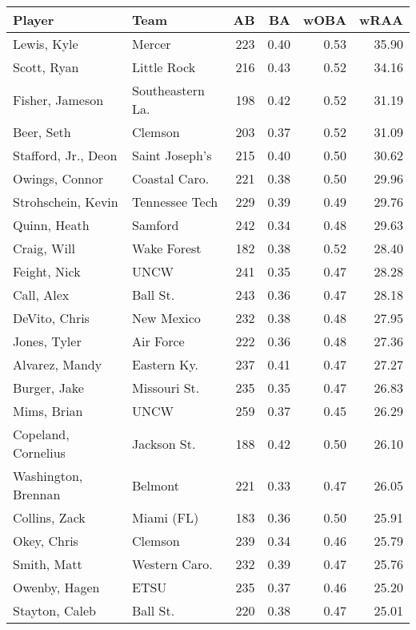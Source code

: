 \documentclass[12pt]{article}
\begin{document}
	
	\begin{table}[ht]
		\centering
		\begin{tabular}{llrrrr}
			\hline
			Player & Team & AB & BA & wOBA & wRAA \\ 
			\hline
			Lewis, Kyle & Mercer & 223 & 0.40 & 0.53 & 35.90 \\ 
			Scott, Ryan & Little Rock & 216 & 0.43 & 0.52 & 34.16 \\ 
			Fisher, Jameson & Southeastern La. & 198 & 0.42 & 0.52 & 31.19 \\ 
			Beer, Seth & Clemson & 203 & 0.37 & 0.52 & 31.09 \\ 
			Stafford, Jr., Deon & Saint Joseph's & 215 & 0.40 & 0.50 & 30.62 \\ 
			Owings, Connor & Coastal Caro. & 221 & 0.38 & 0.50 & 29.96 \\ 
			Strohschein, Kevin & Tennessee Tech & 229 & 0.39 & 0.49 & 29.76 \\ 
			Quinn, Heath & Samford & 242 & 0.34 & 0.48 & 29.63 \\ 
			Craig, Will & Wake Forest & 182 & 0.38 & 0.52 & 28.40 \\ 
			Feight, Nick & UNCW & 241 & 0.35 & 0.47 & 28.28 \\ 
			Call, Alex & Ball St. & 243 & 0.36 & 0.47 & 28.18 \\ 
			DeVito, Chris & New Mexico & 232 & 0.38 & 0.48 & 27.95 \\ 
			Jones, Tyler & Air Force & 222 & 0.36 & 0.48 & 27.36 \\ 
			Alvarez, Mandy & Eastern Ky. & 237 & 0.41 & 0.47 & 27.27 \\ 
			Burger, Jake & Missouri St. & 235 & 0.35 & 0.47 & 26.83 \\ 
			Mims, Brian & UNCW & 259 & 0.37 & 0.45 & 26.29 \\ 
			Copeland, Cornelius & Jackson St. & 188 & 0.42 & 0.50 & 26.10 \\ 
			Washington, Brennan & Belmont & 221 & 0.33 & 0.47 & 26.05 \\ 
			Collins, Zack & Miami (FL) & 183 & 0.36 & 0.50 & 25.91 \\ 
			Okey, Chris & Clemson & 239 & 0.34 & 0.46 & 25.79 \\ 
			Smith, Matt & Western Caro. & 232 & 0.39 & 0.47 & 25.76 \\ 
			Owenby, Hagen & ETSU & 235 & 0.37 & 0.46 & 25.20 \\ 
			Stayton, Caleb & Ball St. & 220 & 0.38 & 0.47 & 25.01 \\ 
			\hline
		\end{tabular}
	\end{table}
	
\end{document}

